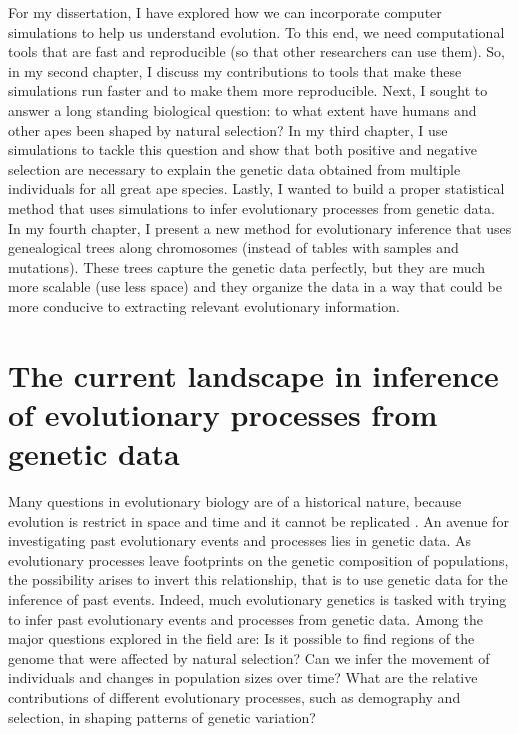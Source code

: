 For my dissertation, I have explored how we can incorporate computer simulations to help us understand evolution.
To this end, we need computational tools that are fast and reproducible (so that other researchers can use them).
So, in my second chapter, I discuss my contributions to tools that make these simulations run faster and to make them more reproducible.
Next, I sought to answer a long standing biological question: to what extent have humans and other apes been shaped by natural selection?
In my third chapter, I use simulations to tackle this question and show that both positive and negative selection are necessary to explain the genetic data obtained from multiple individuals for all great ape species.
Lastly, I wanted to build a proper statistical method that uses simulations to infer evolutionary processes from genetic data.
In my fourth chapter, I present a new method for evolutionary inference that uses genealogical trees along chromosomes
(instead of tables with samples and mutations).
These trees capture the genetic data perfectly, but they are much more scalable (use less space) and
they organize the data in a way that could be more conducive to extracting relevant evolutionary information.

\section{The current landscape in inference of evolutionary processes from genetic data}

Many questions in evolutionary biology are of a historical nature,
because evolution is restrict in space and time and it cannot be replicated \citep{losos_evolutionary_2009, cleland_methodological_2002}.
An avenue for investigating past evolutionary events and processes lies in genetic data.
As evolutionary processes leave footprints on the genetic composition of populations,
the possibility arises to invert this relationship,
that is to use genetic data for the inference of past events.
Indeed, much evolutionary genetics is tasked with trying to infer past evolutionary events and processes from genetic data.
Among the major questions explored in the field are: 
Is it possible to find regions of the genome that were affected by natural selection?
Can we infer the movement of individuals and changes in population sizes over time?
What are the relative contributions of different evolutionary processes, such as demography and selection, in shaping patterns of genetic variation? 

